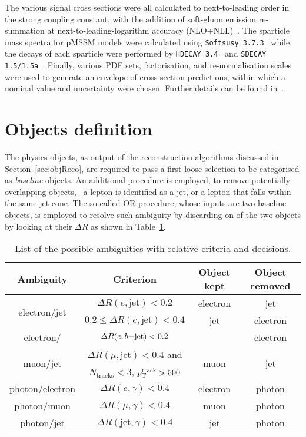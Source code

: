 			The various signal cross sections were all calculated to next-to-leading order in the strong coupling constant, with the addition of soft-gluon emission re-summation at next-to-leading-logarithm accuracy (NLO+NLL)~\cite{Beenakker:1997ut, Beenakker:2010nq, Beenakker:2011fu}. The sparticle mass spectra for \ac{pMSSM} models were calculated using \texttt{Softsusy 3.7.3}~\cite{Allanach:2001kg, Allanach:2013kza} while the decays of each sparticle were performed by \texttt{HDECAY 3.4}~\cite{hdecay} and \texttt{SDECAY 1.5/1.5a}~\cite{sdecay}. Finally, various \ac{PDF} sets, factorisation, and re-normalisation scales were used to generate an envelope of cross-section predictions, within which a nominal value and uncertainty were chosen. Further details can be found in~\cite{Borschensky:2014cia}.



	\section{Objects definition}
	\label{sec:obj_def}
			
		The physics objects, as output of the reconstruction algorithms discussed in Section~\ref{sec:objReco}, are required to pass a first loose selection to be categorised as \emph{baseline} objects. An additional procedure is employed, to remove potentially overlapping objects, \eg\ a lepton is identified as a jet, or a lepton that falls within the same jet cone. The so-called \ac{OR} procedure, whose inputs are two baseline objects, is employed to resolve such ambiguity by discarding on of the two objects by looking at their $\Delta R$ as shown in Table~\ref{tab:OR}. 

		\begin{table}[!htb]\centering\caption{List of the possible ambiguities with relative criteria and decisions.}
			\begin{tabular}{cccc}
				\toprule 
				\textbf{Ambiguity} & \textbf{Criterion} & \textbf{Object kept} & \textbf{Object removed}\\
				\toprule
				\multirow{2}{*}{electron/jet} & $\Delta R (e,\mathrm{jet}) < 0.2$ & electron & jet\\
				& $0.2 \leq \Delta R (e,\mathrm{jet}) < 0.4$ & jet & electron \\\midrule
				electron/\bj & $\Delta R (e,b\mathrm{-jet}) < 0.2$ & \bj\ & electron\\ \midrule
				\multirow{2}{*}{muon/jet} & $\Delta R (\mu,\mathrm{jet}) < 0.4$ and & \multirow{2}{*}{muon} & \multirow{2}{*}{jet} \\ 
						& $N_{\mathrm{tracks}} < 3$, $p_{\mathrm{T}}^{\mathrm{track}} > 500$ \MeV &  &  \\ \midrule
				photon/electron & $\Delta R (e,\gamma) < 0.4$ & electron & photon\\ 
				photon/muon & $\Delta R (\mu,\gamma) < 0.4$ & muon & photon\\ 
				photon/jet & $\Delta R (\mathrm{jet}, \gamma) < 0.4$ & jet & photon\\ 
				\bottomrule
				\end{tabular}
				\label{tab:OR}
		\end{table}

